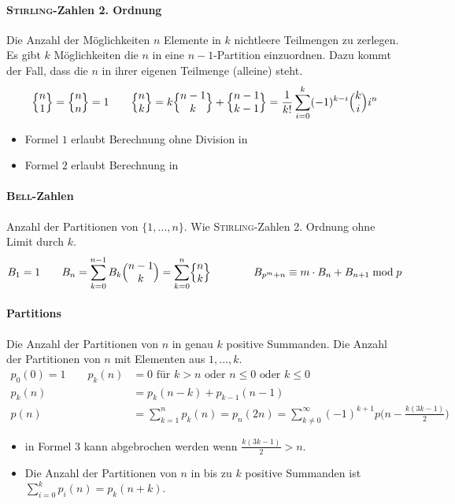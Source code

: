 \paragraph{\textsc{Stirling}-Zahlen 2. Ordnung}
Die Anzahl der Möglichkeiten $n$ Elemente in $k$ nichtleere Teilmengen zu zerlegen.
Es gibt $k$ Möglichkeiten die $n$ in eine $n-1$-Partition einzuordnen.
Dazu kommt der Fall, dass die $n$ in ihrer eigenen Teilmenge (alleine) steht.
\[\Bigl\{ \begin{matrix} n \\ 1 \end{matrix} \Bigr\} = \Bigl\{ \begin{matrix} n \\ n \end{matrix} \Bigr\} = 1 \qquad
\Bigl\{ \begin{matrix} n \\ k \end{matrix} \Bigr\} = k \Bigl\{ \begin{matrix} n-1 \\ k \end{matrix} \Bigr\} + \Bigl\{ \begin{matrix} n-1 \\ k-1 \end{matrix} \Bigr\} =
\frac{1}{k!} \sum\limits_{i=0}^{k} (-1)^{k-i}\Bigl( \begin{matrix} k \\ i \end{matrix} \Bigr)i^n\]
\begin{itemize}
	\item Formel $1$ erlaubt Berechnung ohne Division in 
	\item Formel $2$ erlaubt Berechnung in 
\end{itemize}

\paragraph{\textsc{Bell}-Zahlen}
Anzahl der Partitionen von $\{1, \ldots, n\}$.
Wie \textsc{Stirling}-Zahlen 2. Ordnung ohne Limit durch $k$.
\[B_1 = 1 \qquad
B_n = \sum\limits_{k = 0}^{n - 1} B_k\Bigl( \begin{matrix} n-1 \\ k \end{matrix} \Bigr)
= \sum\limits_{k = 0}^{n}\Bigl\{ \begin{matrix} n \\ k \end{matrix} \Bigr\}\qquad\qquad B_{p^m+n}\equiv m\cdot B_n + B_{n+1} \bmod{p}\]

\paragraph{Partitions}
Die Anzahl der Partitionen von $n$ in genau $k$ positive Summanden.
Die Anzahl der Partitionen von $n$ mit Elementen aus ${1,\dots,k}$.
\begin{align*}
	p_0(0)=1 \qquad p_k(n)&=0 \text{ für } k > n \text{ oder } n \leq 0 \text{ oder } k \leq 0\\
	p_k(n)&= p_k(n-k) + p_{k-1}(n-1)\\[2pt]
	p(n)&=\sum_{k=1}^{n} p_k(n)=p_n(2n)=\sum\limits_{k\neq0}^\infty(-1)^{k+1}p\bigg(n - \frac{k(3k-1)}{2}\bigg)
\end{align*}
\begin{itemize}
	\item in Formel $3$ kann abgebrochen werden wenn $\frac{k(3k-1)}{2} > n$.
	\item Die Anzahl der Partitionen von $n$ in bis zu $k$ positive Summanden ist $\sum\limits_{i=0}^{k}p_i(n)=p_k(n+k)$.
\end{itemize}

